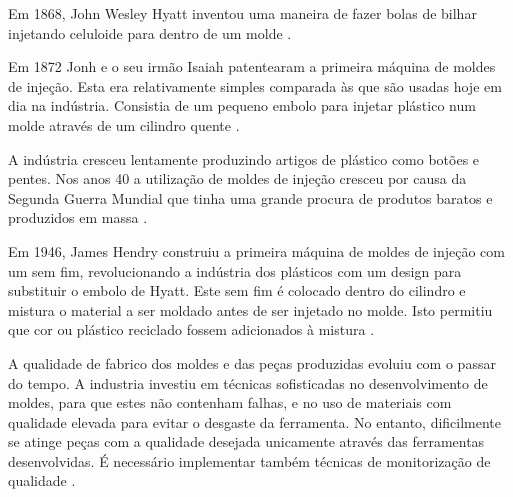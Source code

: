 \documentclass[11pt,twoside,a4paper]{report}
\begin{document}
Em 1868, John Wesley Hyatt inventou uma maneira de fazer bolas de bilhar injetando celuloide para dentro de um molde \cite{historia,patente1868}.\par
Em 1872 Jonh e o seu irmão Isaiah patentearam a primeira máquina de moldes de injeção. Esta era relativamente simples comparada às que são usadas hoje em dia na indústria. Consistia de um pequeno embolo para injetar plástico num molde através de um cilindro quente \cite{historia,patente1872}.\par
A indústria cresceu lentamente produzindo artigos de plástico como botões e pentes. Nos anos 40 a utilização de moldes de injeção cresceu por causa da Segunda Guerra Mundial que tinha uma grande procura de produtos baratos e produzidos em massa \cite{historia}.\par
Em 1946, James Hendry construiu a primeira máquina de moldes de injeção com um sem fim, revolucionando a indústria dos plásticos com um design para substituir o embolo de Hyatt. Este sem fim é colocado dentro do cilindro e mistura o material a ser moldado antes de ser injetado no molde. Isto permitiu que cor ou plástico reciclado fossem adicionados à mistura \cite{historia,patente1946}.\par
A qualidade de fabrico dos moldes e das peças produzidas evoluiu com o passar do tempo. A industria investiu em técnicas sofisticadas no desenvolvimento de moldes, para que estes não contenham falhas, e no uso de materiais com qualidade elevada para evitar o desgaste da ferramenta. No entanto, dificilmente se atinge peças com a qualidade desejada unicamente através das ferramentas desenvolvidas. É necessário implementar também técnicas de monitorização de qualidade \cite{Woll}.
\end{document}
